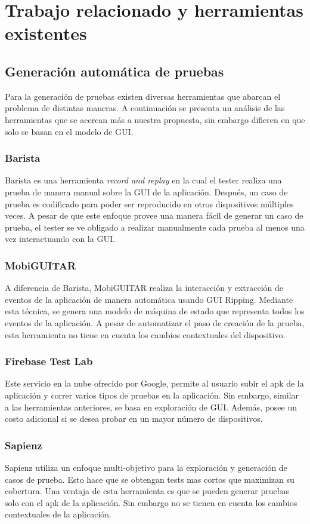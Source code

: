 %
\chapter{Trabajo relacionado y herramientas existentes}
\label{chapter2}

\section{Generación automática de pruebas}
Para la generación de pruebas existen diversas herramientas que abarcan el problema de distintas maneras. A continuación se presenta un análisis de las herramientas que se acercan más a nuestra propuesta, sin embargo difieren en que solo se basan en el modelo de GUI.

\subsection{Barista}
Barista \cite{Fazzini2017} es una herramienta \textit{record and replay} en la cual el tester realiza una prueba de manera manual sobre la GUI de la aplicación. Después, un caso de prueba es codificado para poder ser reproducido en otros dispositivos múltiples veces. A pesar de que este enfoque provee una manera fácil de generar un caso de prueba, el tester se ve obligado a realizar manualmente cada prueba al menos una vez interactuando con la GUI.

\subsection{MobiGUITAR}
A diferencia de Barista, MobiGUITAR \cite{MobiGUITAR} realiza la interacción y extracción de eventos de la aplicación de manera automática usando GUI Ripping. Mediante esta técnica, se genera una modelo de máquina de estado que representa todos los eventos de la aplicación. A pesar de automatizar el paso de creación de la prueba, esta herramienta no tiene en cuenta los cambios contextuales del dispositivo.

\subsection{Firebase Test Lab}
Este servicio \cite{firebase} en la nube ofrecido por Google, permite al usuario subir el apk de la aplicación y correr varios tipos de pruebas en la aplicación. Sin embargo, similar a las herramientas anteriores, se basa en exploración de GUI. Además, posee un costo adicional si se desea probar en un mayor número de dispositivos.

\subsection{Sapienz}
Sapienz\cite{sapienz} utiliza un enfoque multi-objetivo para la exploración y generación de casos de prueba. Esto hace que se obtengan tests mas cortos que maximizan	 su cobertura. Una ventaja de esta herramienta es que se pueden generar pruebas solo con el apk de la aplicación. Sin embargo no se tienen en cuenta los cambios contextuales de la aplicación.
